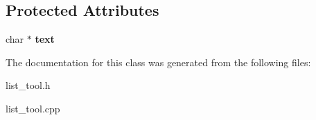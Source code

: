 \subsection*{Protected Attributes}
\begin{DoxyCompactItemize}
\item 
\hypertarget{class_text__element_aa88cdc32a5a73e36d782ee63580662e6}{char $\ast$ {\bfseries text}}\label{db/d3d/class_text__element_aa88cdc32a5a73e36d782ee63580662e6}

\end{DoxyCompactItemize}


The documentation for this class was generated from the following files\-:\begin{DoxyCompactItemize}
\item 
list\-\_\-tool.\-h\item 
list\-\_\-tool.\-cpp\end{DoxyCompactItemize}
